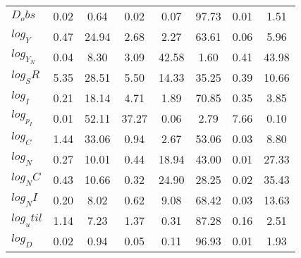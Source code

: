\begin{center}
\begin{longtable}{lccccccc}
$D_obs     $	 & 	        0.02	 & 	        0.64	 & 	        0.02	 & 	        0.07	 & 	       97.73	 & 	        0.01	 & 	        1.51 \\ 
$log_Y     $	 & 	        0.47	 & 	       24.94	 & 	        2.68	 & 	        2.27	 & 	       63.61	 & 	        0.06	 & 	        5.96 \\ 
$log_Y_N   $	 & 	        0.04	 & 	        8.30	 & 	        3.09	 & 	       42.58	 & 	        1.60	 & 	        0.41	 & 	       43.98 \\ 
$log_SR    $	 & 	        5.35	 & 	       28.51	 & 	        5.50	 & 	       14.33	 & 	       35.25	 & 	        0.39	 & 	       10.66 \\ 
$log_I     $	 & 	        0.21	 & 	       18.14	 & 	        4.71	 & 	        1.89	 & 	       70.85	 & 	        0.35	 & 	        3.85 \\ 
$log_p_I   $	 & 	        0.01	 & 	       52.11	 & 	       37.27	 & 	        0.06	 & 	        2.79	 & 	        7.66	 & 	        0.10 \\ 
$log_C     $	 & 	        1.44	 & 	       33.06	 & 	        0.94	 & 	        2.67	 & 	       53.06	 & 	        0.03	 & 	        8.80 \\ 
$log_N     $	 & 	        0.27	 & 	       10.01	 & 	        0.44	 & 	       18.94	 & 	       43.00	 & 	        0.01	 & 	       27.33 \\ 
$log_NC    $	 & 	        0.43	 & 	       10.66	 & 	        0.32	 & 	       24.90	 & 	       28.25	 & 	        0.02	 & 	       35.43 \\ 
$log_NI    $	 & 	        0.20	 & 	        8.02	 & 	        0.62	 & 	        9.08	 & 	       68.42	 & 	        0.03	 & 	       13.63 \\ 
$log_util  $	 & 	        1.14	 & 	        7.23	 & 	        1.37	 & 	        0.31	 & 	       87.28	 & 	        0.16	 & 	        2.51 \\ 
$log_D     $	 & 	        0.02	 & 	        0.94	 & 	        0.05	 & 	        0.11	 & 	       96.93	 & 	        0.01	 & 	        1.93 \\ 
\end{longtable}
 \end{center}
